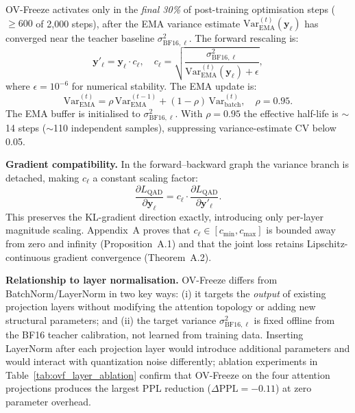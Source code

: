 \documentclass[lettersize,journal]{IEEEtran}
\begin{document}
OV-Freeze activates only in the \emph{final 30\%} of post-training
optimisation steps ($\ge 600$ of 2,000 steps), after the EMA
variance estimate $\mathrm{Var}^{(t)}_{\mathrm{EMA}}(\bm{y}_\ell)$
has converged near the teacher baseline $\sigma^2_{\mathrm{BF16},\ell}$.
The forward rescaling is:
\begin{equation}
  \bm{y}'_\ell = \bm{y}_\ell \cdot c_\ell,\quad
  c_\ell = \sqrt{\frac{\sigma^2_{\mathrm{BF16},\ell}}
                      {\mathrm{Var}^{(t)}_{\mathrm{EMA}}(\bm{y}_\ell)+\epsilon}},
  \label{eq:ovf}
\end{equation}
where $\epsilon = 10^{-6}$ for numerical stability.  The EMA update is:
\begin{equation}
  \mathrm{Var}^{(t)}_{\mathrm{EMA}} = \rho\,\mathrm{Var}^{(t-1)}_{\mathrm{EMA}}
    + (1-\rho)\,\mathrm{Var}^{(t)}_{\mathrm{batch}},\quad \rho = 0.95.
  \label{eq:ema}
\end{equation}
The EMA buffer is initialised to $\sigma^2_{\mathrm{BF16},\ell}$.  With
$\rho = 0.95$ the effective half-life is $\sim$14 steps ($\sim$110
independent samples), suppressing variance-estimate CV below 0.05.

\textbf{Gradient compatibility.} In the forward--backward graph the
variance branch is detached, making $c_\ell$ a constant scaling
factor:
\begin{equation}
  \frac{\partial L_{\mathrm{QAD}}}{\partial\bm{y}_\ell}
    = c_\ell \cdot \frac{\partial L_{\mathrm{QAD}}}{\partial\bm{y}'_\ell}.
  \label{eq:ovf-detach}
\end{equation}
This preserves the KL-gradient direction exactly, introducing only
per-layer magnitude scaling.  Appendix~A proves that $c_\ell \in
[c_{\min},c_{\max}]$ is bounded away from zero and infinity
(Proposition~A.1) and that the joint loss retains Lipschitz-continuous
gradient convergence (Theorem~A.2).

\textbf{Relationship to layer normalisation.} OV-Freeze differs
from BatchNorm/LayerNorm in two key ways: (i) it targets the
\emph{output} of existing projection layers without modifying the
attention topology or adding new structural parameters; and (ii) the
target variance $\sigma^2_{\mathrm{BF16},\ell}$ is fixed offline from
the BF16 teacher calibration, not learned from training data.
Inserting LayerNorm after each projection layer would introduce
additional parameters and would interact with quantization noise
differently; ablation experiments in
Table~\ref{tab:ovf_layer_ablation} confirm that OV-Freeze on the
four attention projections produces the largest PPL reduction
($\Delta\text{PPL} = -0.11$) at zero parameter overhead.
\end{document}
